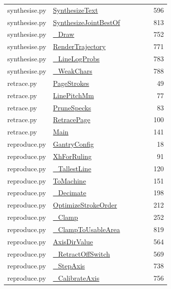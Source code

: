 \documentclass[11pt,a4paper,oneside]{report}
\begin{document}
\begin{longtable}{p{0.28\linewidth}p{0.48\linewidth}r}
synthesise.py & \hyperref[fn:synthesise:SynthesizeText]{SynthesizeText} & 596\\
synthesise.py & \hyperref[fn:synthesise:SynthesizeJointBestOf]{SynthesizeJointBestOf} & 813\\
synthesise.py & \hyperref[fn:synthesise:-Draw]{\_Draw} & 752\\
synthesise.py & \hyperref[fn:synthesise:RenderTrajectory]{RenderTrajectory} & 771\\
synthesise.py & \hyperref[fn:synthesise:-LineLogProbs]{\_LineLogProbs} & 783\\
synthesise.py & \hyperref[fn:synthesise:-WeakChars]{\_WeakChars} & 788\\
retrace.py & \hyperref[fn:retrace:PageStrokes]{PageStrokes} & 49\\
retrace.py & \hyperref[fn:retrace:LinePitchMm]{LinePitchMm} & 77\\
retrace.py & \hyperref[fn:retrace:PruneSpecks]{PruneSpecks} & 83\\
retrace.py & \hyperref[fn:retrace:RetracePage]{RetracePage} & 100\\
retrace.py & \hyperref[fn:retrace:Main]{Main} & 141\\
reproduce.py & \hyperref[fn:reproduce:GantryConfig]{GantryConfig} & 18\\
reproduce.py & \hyperref[fn:reproduce:XhForRuling]{XhForRuling} & 91\\
reproduce.py & \hyperref[fn:reproduce:-TallestLine]{\_TallestLine} & 120\\
reproduce.py & \hyperref[fn:reproduce:ToMachine]{ToMachine} & 151\\
reproduce.py & \hyperref[fn:reproduce:-Decimate]{\_Decimate} & 198\\
reproduce.py & \hyperref[fn:reproduce:OptimizeStrokeOrder]{OptimizeStrokeOrder} & 212\\
reproduce.py & \hyperref[fn:reproduce:-Clamp]{\_Clamp} & 252\\
reproduce.py & \hyperref[fn:reproduce:-ClampToUsableArea]{\_ClampToUsableArea} & 819\\
reproduce.py & \hyperref[fn:reproduce:AxisDirValue]{AxisDirValue} & 564\\
reproduce.py & \hyperref[fn:reproduce:-RetractOffSwitch]{\_RetractOffSwitch} & 569\\
reproduce.py & \hyperref[fn:reproduce:-StepAxis]{\_StepAxis} & 738\\
reproduce.py & \hyperref[fn:reproduce:-CalibrateAxis]{\_CalibrateAxis} & 756\\

\end{longtable}
\end{document}
